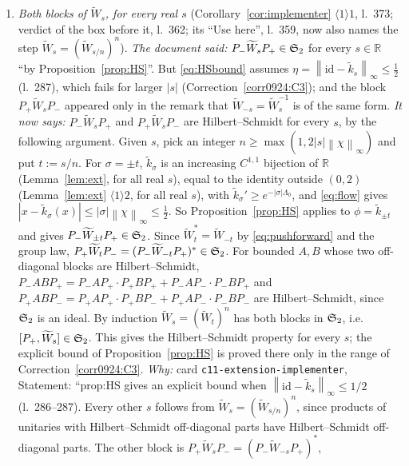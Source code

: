 \documentclass[11pt]{article}
\newcommand{\Pp}{P_+}\newcommand{\Pm}{P_-}
\newcommand{\Wt}{\widetilde W}\newcommand{\kt}{\widetilde k}
\newcommand{\norm}[1]{\left\lVert #1\right\rVert}\newcommand{\abs}[1]{\left|#1\right|}
\begin{document}
\begin{enumerate}[label=(C\arabic*),ref=C\arabic*,leftmargin=3em]
 is not implementable although the old hypothesis holds.  Knowledge-base card
 \texttt{c11-extension-implementer}, DOCUMENT ERROR note and Statement: ``with $W'$ a unitary of
 $L^2(I')$ such that $\Pm(\one\oplus W')\Pp$ and $\Pp(\one\oplus W')\Pm$ are both Hilbert--Schmidt.
 The Shale--Stinespring criterion needs both off-diagonal blocks''.
\item\label{corr0924:C2} \emph{Both blocks of $\Wt_s$, for every real $s$}
 (Corollary~\ref{cor:implementer} $\langle1\rangle1$, l.~373; verdict of the box before it, l.~362;
 its ``Use here'', l.~359, now also names the step $\Wt_s=(\Wt_{s/n})^n$).
 \emph{The document said:} $\Pm\Wt_s\Pp\in\Stwo$ for every $s\in\mathbb R$ ``by
 Proposition~\ref{prop:HS}''.  But \eqref{eq:HSbound} assumes $\eta=\norm{\mathrm{id}-\kt_s}_\infty
 \le\frac12$ (l.~287), which fails for larger $|s|$ (Correction~\ref{corr0924:C3}); and the block
 $\Pp\Wt_s\Pm$ appeared only in the remark that $\Wt_{-s}=\Wt_s^{-1}$ is of the same form.
 \emph{It now says:} $\Pm\Wt_s\Pp$ and $\Pp\Wt_s\Pm$ are Hilbert--Schmidt for every $s$, by the
 following argument.  Given $s$, pick an integer $n\ge\max(1,2|s|\norm\chi_\infty)$ and put
 $t:=s/n$.  For $\sigma=\pm t$, $\kt_\sigma$ is an increasing $C^{1,1}$ bijection of $\mathbb R$
 (Lemma~\ref{lem:ext}, for all real $s$), equal to the identity outside $(0,2)$
 (Lemma~\ref{lem:ext} $\langle1\rangle2$, for all real $s$), with $\kt_\sigma'\ge e^{-|\sigma|\Lambda_0}$,
 and \eqref{eq:flow} gives $|x-\kt_\sigma(x)|\le|\sigma|\norm\chi_\infty\le\frac12$.  So
 Proposition~\ref{prop:HS} applies to $\phi=\kt_{\pm t}$ and gives $\Pm\Wt_{\pm t}\Pp\in\Stwo$.
 Since $\Wt_t^*=\Wt_{-t}$ by \eqref{eq:pushforward} and the group law,
 $\Pp\Wt_t\Pm=(\Pm\Wt_{-t}\Pp)^*\in\Stwo$.  For bounded $A,B$ whose two off-diagonal blocks are
 Hilbert--Schmidt, $\Pm AB\Pp=\Pm A\Pp\cdot\Pp B\Pp+\Pm A\Pm\cdot\Pm B\Pp$ and
 $\Pp AB\Pm=\Pp A\Pp\cdot\Pp B\Pm+\Pp A\Pm\cdot\Pm B\Pm$ are Hilbert--Schmidt, since $\mathfrak S_2$ is an
 ideal.  By induction $\Wt_s=(\Wt_t)^n$ has both blocks in $\mathfrak S_2$, i.e.\ $[\Pp,\Wt_s]\in\Stwo$.
 This gives the Hilbert--Schmidt property for every $s$; the explicit bound of
 Proposition~\ref{prop:HS} is proved there only in the range of Correction~\ref{corr0924:C3}.
 \emph{Why:} card \texttt{c11-extension-implementer}, Statement: ``prop:HS gives an explicit bound
 when $\norm{\mathrm{id}-\kt_s}_\infty\le1/2$ (l.~286--287).  Every other $s$ follows from
 $\Wt_s=(\Wt_{s/n})^n$, since products of unitaries with Hilbert--Schmidt off-diagonal parts have
 Hilbert--Schmidt off-diagonal parts.  The other block is $\Pp\Wt_s\Pm=(\Pm\Wt_{-s}\Pp)^*$,

\end{enumerate}
\end{document}
